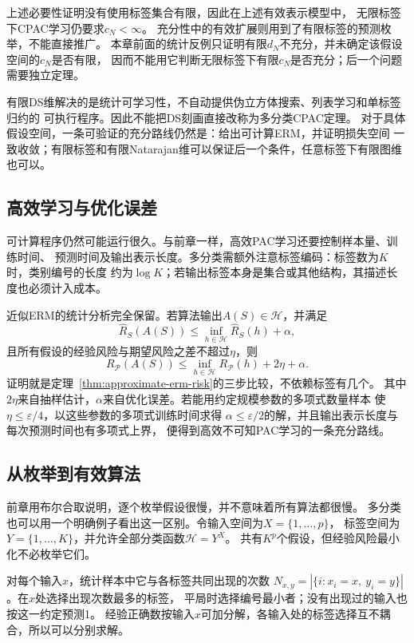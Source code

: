 上述必要性证明没有使用标签集合有限，因此在上述有效表示模型中，
无限标签下CPAC学习仍要求$c_N<\infty$。
充分性中的有效扩展则用到了有限标签的预测枚举，不能直接推广。
本章前面的统计反例只证明有限$d_N$不充分，并未确定该假设空间的$c_N$是否有限，
因而不能用它判断无限标签下有限$c_N$是否充分；后一个问题需要独立定理。

有限DS维解决的是统计可学习性，不自动提供伪立方体搜索、列表学习和单标签归约的
可执行程序。因此不能把DS刻画直接改称为多分类CPAC定理。
对于具体假设空间，一条可验证的充分路线仍然是：给出可计算ERM，并证明损失空间
一致收敛；有限标签和有限Natarajan维可以保证后一个条件，任意标签下有限图维也可以。

\subsection{高效学习与优化误差}

可计算程序仍然可能运行很久。与前章一样，高效PAC学习还要控制样本量、训练时间、
预测时间及输出表示长度。多分类需额外注意标签编码：标签数为$K$时，类别编号的长度
约为$\log K$；若输出标签本身是集合或其他结构，其描述长度也必须计入成本。

近似ERM的统计分析完全保留。若算法输出$A(S)\in\mathcal H$，并满足
\[
 \hat R_S(A(S))\leq\inf_{h\in\mathcal H}\hat R_S(h)+\alpha,
\]
且所有假设的经验风险与期望风险之差不超过$\eta$，则
\[
 R_{\mathcal P}(A(S))\leq\inf_{h\in\mathcal H}R_{\mathcal P}(h)+2\eta+\alpha.
\]
证明就是定理~\ref{thm:approximate-erm-risk}的三步比较，不依赖标签有几个。
其中$2\eta$来自抽样估计，$\alpha$来自优化误差。若能用约定规模参数的多项式数量样本
使$\eta\leq\varepsilon/4$，以这些参数的多项式训练时间求得
$\alpha\leq\varepsilon/2$的解，并且输出表示长度与每次预测时间也有多项式上界，
便得到高效不可知PAC学习的一条充分路线。

\subsection{从枚举到有效算法}

前章用布尔合取说明，逐个枚举假设很慢，并不意味着所有算法都很慢。
多分类也可以用一个明确例子看出这一区别。令输入空间为$X=\{1,\ldots,p\}$，
标签空间为$Y=\{1,\ldots,K\}$，并允许全部分类函数$\mathcal H=Y^X$。
共有$K^p$个假设，但经验风险最小化不必枚举它们。

对每个输入$x$，统计样本中它与各标签共同出现的次数
$N_{x,y}=|\{i:x_i=x,\ y_i=y\}|$。在$x$处选择出现次数最多的标签，
平局时选择编号最小者；没有出现过的输入也按这一约定预测1。
经验正确数按输入$x$可加分解，各输入处的标签选择互不耦合，所以可以分别求解。

